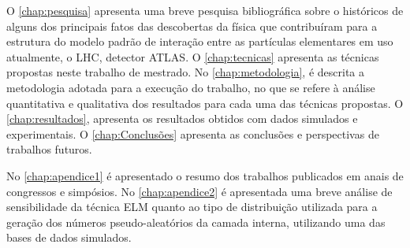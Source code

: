 
O \autoref{chap:pesquisa} apresenta uma breve pesquisa bibliográfica sobre o históricos de alguns dos principais fatos das descobertas da física que contribuíram para a estrutura do modelo padrão de interação entre as partículas elementares em uso atualmente, o LHC, detector ATLAS. O \autoref{chap:tecnicas} apresenta as técnicas propostas neste trabalho de mestrado. No \autoref{chap:metodologia}, é descrita a metodologia adotada para a execução do trabalho, no que se refere à análise quantitativa e qualitativa dos resultados para cada uma das técnicas propostas. O \autoref{chap:resultados}, apresenta os resultados obtidos com dados simulados e experimentais. O \autoref{chap:Conclusões} apresenta as conclusões e perspectivas de trabalhos futuros.

No \autoref{chap:apendice1} é apresentado o resumo dos trabalhos publicados em anais de congressos e simpósios. No \autoref{chap:apendice2} é apresentada uma breve análise de sensibilidade da técnica ELM quanto ao tipo de distribuição utilizada para a geração dos números pseudo-aleatórios da camada interna, utilizando uma das bases de dados simulados.
